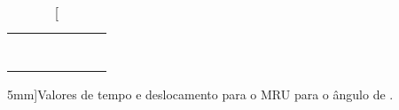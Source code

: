 \begin{table*}[!ht]
\begin{tabular}{lp{25mm}p{25mm}p{25mm}p{25mm}p{25mm}l}
	& \cellcolor[gray]{0.95} & \cellcolor[gray]{0.97} \\ 
	& \cellcolor[gray]{0.89} & \cellcolor[gray]{0.92} \\ 
	& \cellcolor[gray]{0.95} & \cellcolor[gray]{0.97} \\ 
	& \cellcolor[gray]{0.89} & \cellcolor[gray]{0.92} \\ 
	& \cellcolor[gray]{0.95} & \cellcolor[gray]{0.97} \\ 
	& \cellcolor[gray]{0.89} & \cellcolor[gray]{0.92} \\ 
	& \cellcolor[gray]{0.95} & \cellcolor[gray]{0.97} \\ 
	\cmidrule{2-3}
\bottomrule
\end{tabular}
\caption[][5mm]{Valores de tempo e deslocamento para o MRU para o ângulo de .}
\label{DadosMRU2}
\end{table*}


